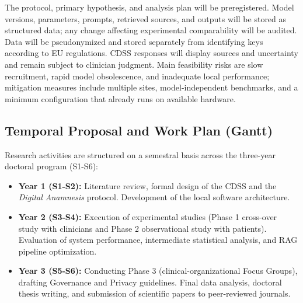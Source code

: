 \documentclass[11pt,a4paper]{article}
\begin{document}
The protocol, primary hypothesis, and analysis plan will be preregistered. Model versions, parameters, prompts, retrieved sources, and outputs will be stored as structured data; any change affecting experimental comparability will be audited. Data will be pseudonymized and stored separately from identifying keys according to EU regulations. CDSS responses will display sources and uncertainty and remain subject to clinician judgment. Main feasibility risks are slow recruitment, rapid model obsolescence, and inadequate local performance; mitigation measures include multiple sites, model-independent benchmarks, and a minimum configuration that already runs on available hardware.

\subsection{Temporal Proposal and Work Plan (Gantt)}

Research activities are structured on a semestral basis across the three-year doctoral program (S1-S6):
\begin{itemize}
    \item \textbf{Year 1 (S1-S2):} Literature review, formal design of the CDSS and the \textit{Digital Anamnesis} protocol. Development of the local software architecture.
    \item \textbf{Year 2 (S3-S4):} Execution of experimental studies (Phase 1 cross-over study with clinicians and Phase 2 observational study with patients). Evaluation of system performance, intermediate statistical analysis, and RAG pipeline optimization.
    \item \textbf{Year 3 (S5-S6):} Conducting Phase 3 (clinical-organizational Focus Groups), drafting Governance and Privacy guidelines. Final data analysis, doctoral thesis writing, and submission of scientific papers to peer-reviewed journals.
\end{itemize}
\end{document}

